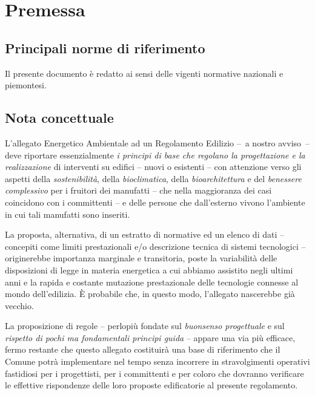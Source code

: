 
\chapter{Premessa}
\label{chp:premessa}

\section{Principali norme di riferimento}
\label{sec:norme-riferimento-princ}

Il presente documento è redatto ai sensi delle vigenti normative nazionali e piemontesi.


\section{Nota concettuale}
\label{sec:nota-import}

L'allegato Energetico Ambientale ad un Regolamento Edilizio –~a nostro avviso~– deve riportare essenzialmente \emph{i principi di base che regolano la progettazione e la realizzazione} di interventi su edifici – nuovi o esistenti – con attenzione verso gli aspetti della \emph{sostenibilità}, della \emph{bioclimatica}, della \emph{bioarchitettura} e del \emph{benessere complessivo} per i fruitori dei manufatti  – che nella maggioranza dei casi coincidono con i committenti – e delle persone che dall'esterno vivono l'ambiente in cui tali manufatti sono inseriti.

La proposta, alternativa, di un estratto di normative ed un elenco di dati – concepiti come limiti prestazionali e/o descrizione tecnica di sistemi tecnologici – originerebbe importanza marginale e transitoria, poste la variabilità delle disposizioni di legge in materia energetica a cui abbiamo assistito negli ultimi anni e la rapida e costante mutazione prestazionale delle tecnologie connesse al mondo dell'edilizia. È probabile che, in questo modo, l'allegato nascerebbe già vecchio. 

La proposizione di regole – perlopiù fondate sul \emph{buonsenso progettuale} e sul \emph{rispetto di pochi ma fondamentali principi guida} – appare una via più efficace,  fermo restante che questo allegato costituirà una base di riferimento che il Comune potrà implementare  nel tempo senza incorrere in stravolgimenti operativi fastidiosi per i progettisti, per i committenti e per coloro che dovranno verificare le effettive rispondenze delle loro proposte edificatorie al presente regolamento.





